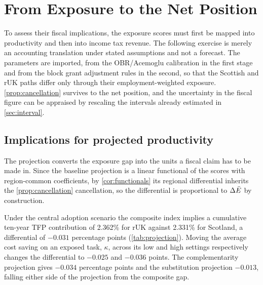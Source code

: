 \section{From Exposure to the Net Position}\label{sec:translation}

To assess their fiscal implications, the exposure scores must first be mapped into productivity and then into income tax revenue. The following exercise is merely an accounting translation under stated assumptions and not a forecast. The parameters are imported, from the OBR/Acemoglu calibration in the first stage and from the block grant adjustment rules in the second, so that the Scottish and rUK paths differ only through their employment-weighted exposure. 
\cref{prop:cancellation} survives to the net position, and the uncertainty in the fiscal figure can be appraised by rescaling the intervals already estimated in \cref{sec:interval}. 

\subsection{Implications for projected productivity}\label{sec:productivity}

The projection converts the exposure gap into the units a fiscal claim has to be made in. Since the baseline projection is a linear functional of the scores with region-common coefficients, by \cref{cor:functionals} its regional differential inherits the \cref{prop:cancellation} cancellation, so the differential is proportional to $\Delta\bar{E}$ by construction. 

Under the central adoption scenario the composite index implies a cumulative ten-year TFP contribution of 2.362\% for rUK against 2.331\% for Scotland, a differential of $-0.031$ percentage points (\cref{tab:projection}). Moving the average cost saving on an exposed task, $\kappa$, across its low and high settings respectively changes the differential to $-0.025$ and $-0.036$ points. The complementarity projection gives $-0.034$ percentage points and the substitution projection $-0.013$, falling either side of the projection from the composite gap.

